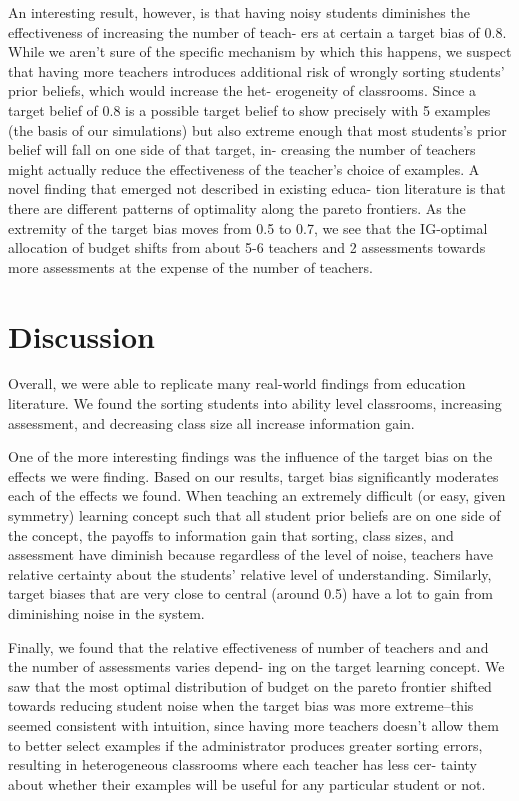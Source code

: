 \documentclass[10pt, letterpaper]{article}
\begin{document}
An interesting result, however, is that having noisy students diminishes
the effectiveness of increasing the number of teach- ers at certain a
target bias of 0.8. While we aren't sure of the specific mechanism by
which this happens, we suspect that having more teachers introduces
additional risk of wrongly sorting students' prior beliefs, which would
increase the het- erogeneity of classrooms. Since a target belief of 0.8
is a possible target belief to show precisely with 5 examples (the basis
of our simulations) but also extreme enough that most students's prior
belief will fall on one side of that target, in- creasing the number of
teachers might actually reduce the effectiveness of the teacher's choice
of examples. A novel finding that emerged not described in existing
educa- tion literature is that there are different patterns of
optimality along the pareto frontiers. As the extremity of the target
bias moves from 0.5 to 0.7, we see that the IG-optimal allocation of
budget shifts from about 5-6 teachers and 2 assessments towards more
assessments at the expense of the number of teachers.

\section{Discussion}\label{discussion}

Overall, we were able to replicate many real-world findings from
education literature. We found the sorting students into ability level
classrooms, increasing assessment, and decreasing class size all
increase information gain.

One of the more interesting findings was the influence of the target
bias on the effects we were finding. Based on our results, target bias
significantly moderates each of the effects we found. When teaching an
extremely difficult (or easy, given symmetry) learning concept such that
all student prior beliefs are on one side of the concept, the payoffs to
information gain that sorting, class sizes, and assessment have diminish
because regardless of the level of noise, teachers have relative
certainty about the students' relative level of understanding.
Similarly, target biases that are very close to central (around 0.5)
have a lot to gain from diminishing noise in the system.

Finally, we found that the relative effectiveness of number of teachers
and and the number of assessments varies depend- ing on the target
learning concept. We saw that the most optimal distribution of budget on
the pareto frontier shifted towards reducing student noise when the
target bias was more extreme--this seemed consistent with intuition,
since having more teachers doesn't allow them to better select examples
if the administrator produces greater sorting errors, resulting in
heterogeneous classrooms where each teacher has less cer- tainty about
whether their examples will be useful for any particular student or not.
\end{document}
